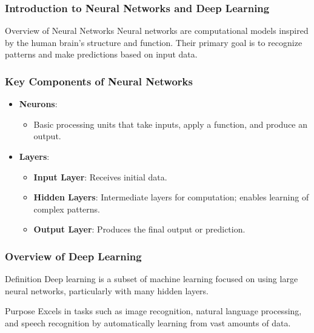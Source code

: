 \documentclass[aspectratio=169]{beamer}
\begin{document}
\frame{\titlepage}

\begin{frame}[fragile]
    \frametitle{Introduction to Neural Networks and Deep Learning}
    \begin{block}{Overview of Neural Networks}
        Neural networks are computational models inspired by the human brain's structure and function.
        Their primary goal is to recognize patterns and make predictions based on input data.
    \end{block}
\end{frame}

\begin{frame}[fragile]
    \frametitle{Key Components of Neural Networks}
    \begin{itemize}
        \item \textbf{Neurons}:
        \begin{itemize}
            \item Basic processing units that take inputs, apply a function, and produce an output.
        \end{itemize}
        \item \textbf{Layers}:
        \begin{itemize}
            \item \textbf{Input Layer}: Receives initial data.
            \item \textbf{Hidden Layers}: Intermediate layers for computation; enables learning of complex patterns.
            \item \textbf{Output Layer}: Produces the final output or prediction.
        \end{itemize}
    \end{itemize}
\end{frame}

\begin{frame}[fragile]
    \frametitle{Overview of Deep Learning}
    \begin{block}{Definition}
        Deep learning is a subset of machine learning focused on using large neural networks, particularly with many hidden layers.
    \end{block}
    \begin{block}{Purpose}
        Excels in tasks such as image recognition, natural language processing, and speech recognition by automatically learning from vast amounts of data.
    \end{block}
\end{frame}
\end{document}
